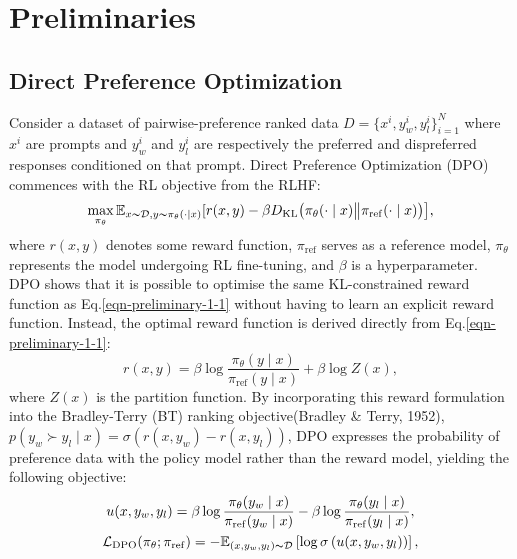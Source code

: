 \section{Preliminaries}

\subsection{Direct Preference Optimization}
Consider a dataset of pairwise-preference ranked data $D = \{ x^i, y^i_w, y^i_l\}^N_{i=1}$ where $x^i$ are  prompts and $y^i_w$ and $y^i_l$ are respectively the preferred and dispreferred responses conditioned on that prompt. 
Direct Preference Optimization (DPO) commences with the RL objective from the RLHF:
\begin{equation}\label{eqn-preliminary-1-1}
    \max_{\pi_\theta}\mathbb{E}_{x\thicksim\mathcal{D},y\thicksim\pi_\theta(\cdot|x)}[r(x,y)-\beta D_{\mathrm{KL}}\big(\pi_\theta(\cdot\mid x)\big\Vert\pi_{\mathrm{ref}}(\cdot\mid x)\big)\big],
\end{equation}
where $r(x, y)$ denotes some reward function, $\pi_{\mathrm{ref}}$ serves as a reference model, $\pi_\theta$ represents the model undergoing RL fine-tuning, and $\beta$ is a hyperparameter. DPO shows that it is possible to optimise the same KL-constrained reward function as Eq.\ref{eqn-preliminary-1-1} without having to learn an explicit reward function. Instead, the optimal reward function is derived directly from Eq.\ref{eqn-preliminary-1-1}:
\begin{equation}
    \label{eqn-preliminary-1-2}
    r(x,y)=\beta\log\frac{\pi_\theta(y\mid x)}{\pi_{\mathrm{ref}}(y\mid x)}+\beta\log Z(x),
\end{equation}
where $Z(x)$ is the partition function. By incorporating this reward formulation into the Bradley-Terry (BT) ranking objective(Bradley \& Terry, 1952), $p(y_w \succ y_l \mid x) = \sigma (r(x, y_w) - r(x, y_l))$, DPO expresses the probability of preference data with the policy model rather than the reward model, yielding the following objective: 
\begin{equation}
    \label{eqn-preliminary-1-3}
\begin{gathered}
\begin{aligned}
u(x,y_w,y_l)=\beta\log\frac{\pi_\theta(y_w\mid x)}{\pi_{\mathrm{ref}}(y_w\mid x)}-\beta\log\frac{\pi_\theta(y_l\mid x)}{\pi_{\mathrm{ref}}(y_l\mid x)},
\end{aligned}\\\mathcal{L}_{\mathrm{DPO}}(\pi_{\theta};\pi_{\mathrm{ref}})=-\mathbb{E}_{(x,y_{w},y_{l})\thicksim\mathcal{D}}\left[\log\sigma\left(u(x,y_{w},y_{l})\right)\right],
\end{gathered}
\end{equation}


